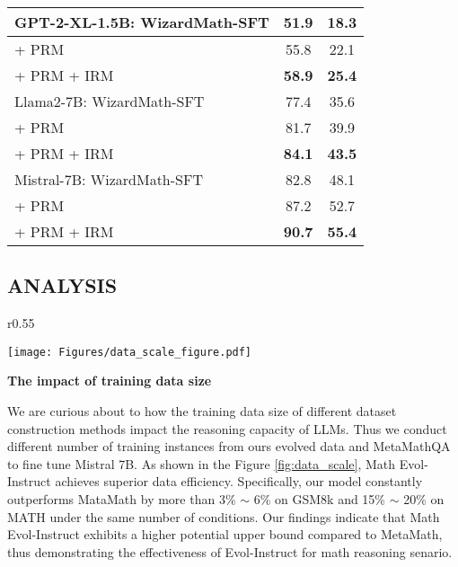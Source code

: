\begin{table}[t]
\begin{minipage}{.52\textwidth}
{\begin{tabular}{lcc}
            \midrule
            GPT-2-XL-1.5B: WizardMath-SFT & 51.9 & 18.3 \\
            \midrule
            \quad + PRM  & 55.8 & 22.1 \\
            \quad + PRM + IRM   & \textbf{58.9} & \textbf{25.4} \\
            \midrule
            Llama2-7B: WizardMath-SFT & 77.4 & 35.6 \\
            \midrule
            \quad + PRM  & 81.7 & 39.9 \\
            \quad + PRM + IRM   & \textbf{84.1} & \textbf{43.5} \\
            \midrule
            \midrule
            Mistral-7B: WizardMath-SFT & 82.8 & 48.1 \\
            \midrule
            \quad + PRM  & 87.2 & 52.7 \\
            \quad + PRM + IRM   & \textbf{90.7} & \textbf{55.4} \\
            \bottomrule
        \end{tabular}
        }
        \label{tab:math_rl_instruction_rm}
    \end{minipage}
\end{table}

\subsection{ANALYSIS}

\begin{wrapfigure}{r}{0.55\textwidth} %
\vspace{-16pt}

\centering
     \texttt{[image: Figures/data\_scale\_figure.pdf]}
     \vspace{-0.6cm}
     \caption{Accuracy of Mistral-7B fine-tuned
in different sizes of augmentation data on GSM8K and MATH }
    \vspace{-0.5cm}
     \label{fig:data_scale}
\end{wrapfigure}

\textbf{The impact of training data size}

We are curious about to how the training data size of different dataset construction methods impact the reasoning capacity of LLMs. Thus we conduct different number of training instances from ours evolved data and MetaMathQA to fine tune Mistral 7B. As shown in the Figure \ref{fig:data_scale}, Math Evol-Instruct achieves superior data efficiency. Specifically, our model  constantly  outperforms MataMath by more than 3\% $\sim$ 6\% on GSM8k and 15\% $\sim$ 20\% on MATH under the same number of conditions. Our findings indicate that Math Evol-Instruct exhibits a higher potential upper bound compared to MetaMath, thus demonstrating the effectiveness of Evol-Instruct for math reasoning senario.

